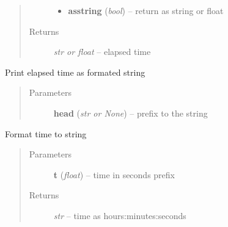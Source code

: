\documentclass[letterpaper,10pt,english]{sphinxmanual}
\begin{document}
\begin{fulllineitems}
\begin{fulllineitems}
\begin{quote}
\begin{description}
\begin{itemize}
\item {} 
\textbf{asstring} (\emph{bool}) --
return as string or float

\end{itemize}

\item[{Returns}] \leavevmode
\emph{str or float} --
elapsed time

\end{description}\end{quote}

\end{fulllineitems}


\begin{fulllineitems}
\label{api/ClearMap.Utils:ClearMap.Utils.Timer.Timer.printElapsedTime}
Print elapsed time as formated string
\begin{quote}\begin{description}
\item[{Parameters}] \leavevmode
\textbf{head} (\emph{str or None}) --
prefix to the string

\end{description}\end{quote}

\end{fulllineitems}


\begin{fulllineitems}
\label{api/ClearMap.Utils:ClearMap.Utils.Timer.Timer.formatElapsedTime}
Format time to string
\begin{quote}\begin{description}
\item[{Parameters}] \leavevmode
\textbf{t} (\emph{float}) --
time in seconds prefix

\item[{Returns}] \leavevmode
\emph{str} --
time as hours:minutes:seconds

\end{description}\end{quote}

\end{fulllineitems}


\end{fulllineitems}
\end{document}

